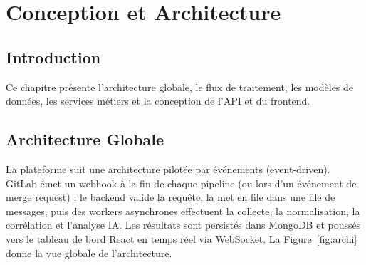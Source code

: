 \documentclass[12pt,a4paper,oneside]{report}
\begin{document}
\chapter{Conception et Architecture}\label{chap:design}
\section{Introduction}
Ce chapitre présente l'architecture globale, le flux de traitement, les modèles de données, les services métiers et la conception de l'API et du frontend.

\section{Architecture Globale}
La plateforme suit une architecture pilotée par événements (event-driven). GitLab émet un webhook à la fin de chaque pipeline (ou lors d'un événement de merge request) ; le backend valide la requête, la met en file dans une file de messages, puis des workers asynchrones effectuent la collecte, la normalisation, la corrélation et l'analyse IA. Les résultats sont persistés dans MongoDB et poussés vers le tableau de bord React en temps réel via WebSocket. La Figure~\ref{fig:archi} donne la vue globale de l'architecture.
\end{document}
